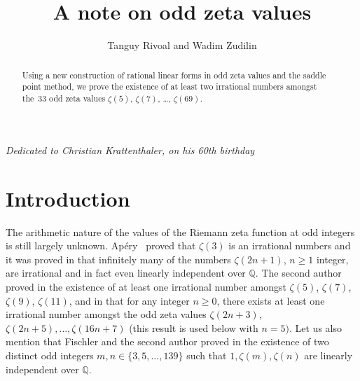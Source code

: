 \documentclass[reqno,12pt]{article}
\theoremstyle{remark}
\begin{document}
\title{A note on odd zeta values}
\author{Tanguy Rivoal and Wadim Zudilin}

\maketitle

\begin{abstract}
Using a new construction of rational linear forms in odd zeta values and the saddle point method, we prove 
the existence of at least two irrational numbers amongst 
the~33 odd zeta values $\zeta(5)$, $\zeta(7)$, \ldots, $\zeta(69)$.
\end{abstract}

\medskip

\hfill {\em Dedicated to Christian Krattenthaler, on his 60th birthday}


\section{Introduction}\label{sec:intro}


The arithmetic nature of the values of the Riemann zeta function at odd integers is still largely unknown.  
Ap\'ery~\cite{ap} proved that $\zeta(3)$ is an irrational numbers and it was proved in \cite{br, ri1} that infinitely many of the numbers $\zeta(2n+1)$, $n\ge 1$ integer, are irrational and in fact even linearly independent over $\mathbb Q$. The second author proved in \cite{zud1} the existence of at least one irrational number amongst $\zeta(5)$, $\zeta(7)$, $\zeta(9)$, $\zeta(11)$, and in  \cite{zud3} that for any integer $n\ge 0$, there exists at least one irrational number amongst the odd zeta values $\zeta(2n+3)$, $\zeta(2n+5), \ldots, \zeta(16n+7)$ (this result is used below with $n=5)$. Let us also mention that 
Fischler and the second author proved in \cite{fizud} the existence of  two distinct odd integers $m, n \in \{3, 5, \ldots, 139\}$ such that $1, \zeta(m), \zeta(n)$ are linearly independent over $\mathbb Q$. 
\end{document}

